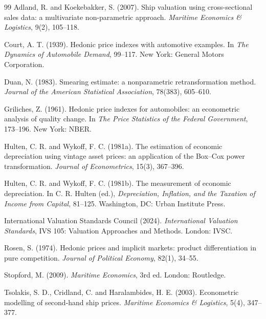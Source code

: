 \documentclass[11pt,a4paper]{article}
\begin{document}
\begin{thebibliography}{99}
Adland, R. and Koekebakker, S. (2007). Ship valuation using cross-sectional sales data: a multivariate non-parametric approach. \emph{Maritime Economics \& Logistics}, 9(2), 105--118.

Court, A. T. (1939). Hedonic price indexes with automotive examples. In \emph{The Dynamics of Automobile Demand}, 99--117. New York: General Motors Corporation.

Duan, N. (1983). Smearing estimate: a nonparametric retransformation method. \emph{Journal of the American Statistical Association}, 78(383), 605--610.

Griliches, Z. (1961). Hedonic price indexes for automobiles: an econometric analysis of quality change. In \emph{The Price Statistics of the Federal Government}, 173--196. New York: NBER.

Hulten, C. R. and Wykoff, F. C. (1981a). The estimation of economic depreciation using vintage asset prices: an application of the Box--Cox power transformation. \emph{Journal of Econometrics}, 15(3), 367--396.

Hulten, C. R. and Wykoff, F. C. (1981b). The measurement of economic depreciation. In C. R. Hulten (ed.), \emph{Depreciation, Inflation, and the Taxation of Income from Capital}, 81--125. Washington, DC: Urban Institute Press.

International Valuation Standards Council (2024). \emph{International Valuation Standards}, IVS 105: Valuation Approaches and Methods. London: IVSC.

Rosen, S. (1974). Hedonic prices and implicit markets: product differentiation in pure competition. \emph{Journal of Political Economy}, 82(1), 34--55.

Stopford, M. (2009). \emph{Maritime Economics}, 3rd ed. London: Routledge.

Tsolakis, S. D., Cridland, C. and Haralambides, H. E. (2003). Econometric modelling of second-hand ship prices. \emph{Maritime Economics \& Logistics}, 5(4), 347--377.
\end{thebibliography}
\end{document}
